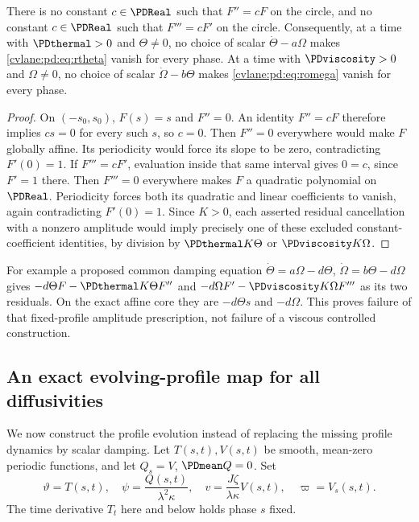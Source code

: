 \begin{cvlanepdproposition}\label{cvlane:pd:prop:noeig}
There is no constant $c\in\PDReal$ such that $F''=cF$ on the circle, and no
constant $c\in\PDReal$ such that $F'''=cF'$ on the circle. Consequently, at
a time with $\PDthermal>0$ and $\Theta\ne0$, no choice of scalar
$\dot\Theta-a\Omega$ makes \eqref{cvlane:pd:eq:rtheta} vanish for every phase.
At a time with $\PDviscosity>0$ and $\Omega\ne0$, no choice of scalar
$\dot\Omega-b\Theta$ makes \eqref{cvlane:pd:eq:romega} vanish for every phase.
\end{cvlanepdproposition}
\begin{proof}
On $(-s_0,s_0)$, $F(s)=s$ and $F''=0$. An identity $F''=cF$ therefore
implies $cs=0$ for every such $s$, so $c=0$. Then $F''=0$ everywhere
would make $F$ globally affine. Its periodicity would force its slope to be
zero, contradicting $F'(0)=1$.
If $F'''=cF'$, evaluation inside that same interval gives $0=c$, since
$F'=1$ there. Then $F'''=0$ everywhere makes $F$ a quadratic polynomial
on $\PDReal$. Periodicity forces both its quadratic and linear coefficients
to vanish, again contradicting $F'(0)=1$.
Since $K>0$, each asserted residual cancellation with a nonzero amplitude
would imply precisely one of these excluded constant-coefficient
identities, by division by $\PDthermal K\Theta$ or $\PDviscosity K\Omega$.
\end{proof}

For example a proposed common damping equation
$\dot\Theta=a\Omega-d\Theta$, $\dot\Omega=b\Theta-d\Omega$ gives
$-d\Theta F-\PDthermal K\Theta F''$ and
$-d\Omega F'-\PDviscosity K\Omega F'''$ as its two residuals. On the exact affine
core they are $-d\Theta s$ and $-d\Omega$.
This proves failure of that fixed-profile amplitude prescription, not
failure of a viscous controlled construction.

\subsection{An exact evolving-profile map for all diffusivities}

We now construct the profile evolution instead of replacing the missing
profile dynamics by scalar damping. Let $T(s,t),V(s,t)$ be smooth,
mean-zero periodic functions, and let $Q_s=V$, $\PDmean Q=0$. Set
\begin{equation}\label{cvlane:pd:eq:generalprofile}
 \vartheta=T(s,t),\quad \psi=\frac{Q(s,t)}{\lambda^2\kappa},\quad
 v=\frac{J\zeta}{\lambda\kappa}V(s,t),\quad \varpi=V_s(s,t).
\end{equation}
The time derivative $T_t$ here and below holds phase $s$ fixed.

